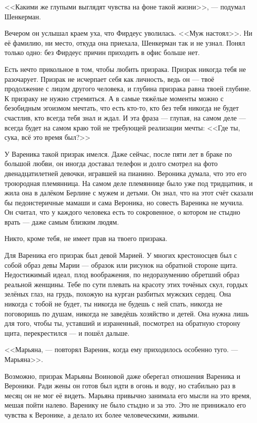 <<Какими же глупыми выглядят чувства на фоне такой жизни>>, --- подумал Шенкерман.

Вечером он услышал краем уха, что Фирдеус уволилась.
<<Муж настоял>>.
Ни её фамилию, ни место, откуда она приехала, Шенкерман так и не узнал.
Понял только одно: без Фирдеус причин приходить в офис больше нет.

\asterism

Есть нечто прикольное в том, чтобы любить призрака.
Призрак никогда тебя не разочарует.
Призрак не исчерпает себя как личность, ведь он --- твоё продолжение с лицом другого человека, и глубина призрака равна твоей глубине.
К призраку не нужно стремиться.
А в самые тяжёлые моменты можно с безобидным эгоизмом мечтать, что есть кто-то, кто без тебя никогда не будет счастлив, кто всегда тебя знал и ждал.
И эта фраза --- глупая, на самом деле --- всегда будет на самом краю той не требующей реализации мечты:
<<Где ты, сука, всё это время был?>>

У Вареника такой призрак имелся.
Даже сейчас, после пяти лет в браке по большой любви, он иногда доставал телефон и долго смотрел на фото двенадцатилетней девочки, игравшей на пианино.
Вероника думала, что это его троюродная племянница.
На самом деле племяннице было уже под тридцатник, и жила она в далёком Берлине с мужем и детьми.
Он знал, что на этот счёт сказали бы педоистеричные мамаши и сама Вероника, но совесть Вареника не мучила.
Он считал, что у каждого человека есть то сокровенное, о котором не стыдно врать --- даже самым близким людям.

Никто, кроме тебя, не имеет прав на твоего призрака.

Для Вареника его призрак был девой Марией.
У многих крестоносцев был с собой образ девы Марии --- образок или рисунок на обратной стороне щита.
Недостижимый идеал, плод воображения, по недоразумению обретший образ реальной женщины.
Тебе по сути плевать на красоту этих точёных скул, гордых зелёных глаз, на грудь, похожую на курган разбитых мужских сердец.
Она никогда с тобой не будет, ты никогда не будешь с ней спать, никогда не поговоришь по душам, никогда не заведёшь хозяйство и детей.
Она нужна лишь для того, чтобы ты, уставший и израненный, посмотрел на обратную сторону щита, перекрестился --- и пошёл дальше.

<<Марьяна, --- повторял Вареник, когда ему приходилось особенно туго.
--- Марьяна>>.

Возможно, призрак Марьяны Воиновой даже оберегал отношения Вареника и Вероники.
Ради жены он готов был идти в огонь и воду, но стабильно раз в месяц он не мог её видеть.
Марьяна привычно занимала его мысли на это время, мешая пойти налево.
Варенику не было стыдно и за это.
Это не принижало его чувства к Веронике, а делало их более человеческими, живыми.

